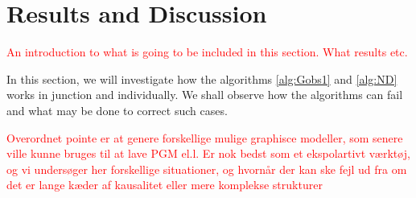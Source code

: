 \documentclass[../Thesis.tex]{subfiles}
\begin{document}
\chapter{Results and Discussion}\label{chap:results}
\textcolor{red}{An introduction to what is going to be included in this section. What results etc.}

In this section, we will investigate how the algorithms \autoref{alg:Gobs1} and \autoref{alg:ND} works in junction and individually. We shall observe how the algorithms can fail and what may be done to correct such cases.

\textcolor{red}{Overordnet pointe er at genere forskellige mulige graphisce modeller, som senere ville kunne bruges til at lave PGM el.l. Er nok bedst som et ekspolartivt værktøj, og vi undersøger her forskellige situationer, og hvornår der kan ske fejl ud fra om det er lange kæder af kausalitet eller mere komplekse strukturer}



\newpage
\end{document}
